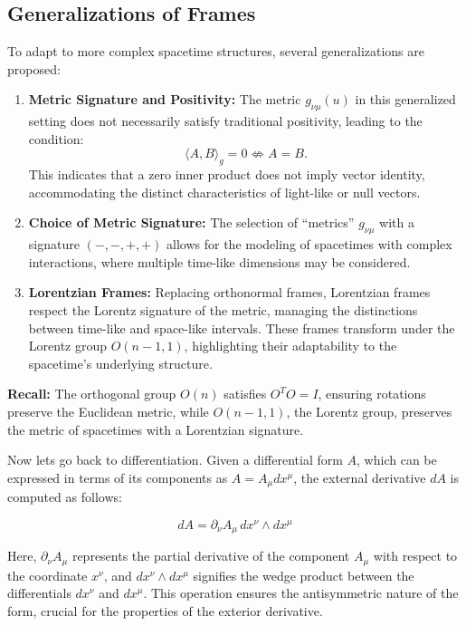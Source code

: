 \documentclass{article}
\begin{document}
\subsection*{Generalizations of Frames}

To adapt to more complex spacetime structures, several generalizations are proposed:
\begin{enumerate}
    \item \textbf{Metric Signature and Positivity:} The metric \(g_{\nu\mu}(u)\) in this generalized setting does not necessarily satisfy traditional positivity, leading to the condition:
    \[
    \langle A, B \rangle_g = 0 \not\Leftrightarrow A = B.
    \]
    This indicates that a zero inner product does not imply vector identity, accommodating the distinct characteristics of light-like or null vectors.

    \item \textbf{Choice of Metric Signature:} The selection of ``metrics'' \(g_{\nu\mu}\) with a signature \((-,-,+,+)\) allows for the modeling of spacetimes with complex interactions, where multiple time-like dimensions may be considered.

    \item \textbf{Lorentzian Frames:} Replacing orthonormal frames, Lorentzian frames respect the Lorentz signature of the metric, managing the distinctions between time-like and space-like intervals. These frames transform under the Lorentz group \(O(n-1,1)\), highlighting their adaptability to the spacetime's underlying structure.
\end{enumerate}

\textbf{Recall:} The orthogonal group \(O(n)\) satisfies \(O^T O = I\), ensuring rotations preserve the Euclidean metric, while \(O(n-1,1)\), the Lorentz group, preserves the metric of spacetimes with a Lorentzian signature.

Now lets go back to differentiation. 
Given a differential form \(A\), which can be expressed in terms of its components as \(A = A_\mu dx^\mu\), the external derivative \(dA\) is computed as follows:

\[
dA = \partial_\nu A_\mu \, dx^\nu \wedge dx^\mu
\]

Here, \( \partial_\nu A_\mu \) represents the partial derivative of the component \(A_\mu\) with respect to the coordinate \(x^\nu\), and \(dx^\nu \wedge dx^\mu\) signifies the wedge product between the differentials \(dx^\nu\) and \(dx^\mu\). This operation ensures the antisymmetric nature of the form, crucial for the properties of the exterior derivative.
\end{document}
